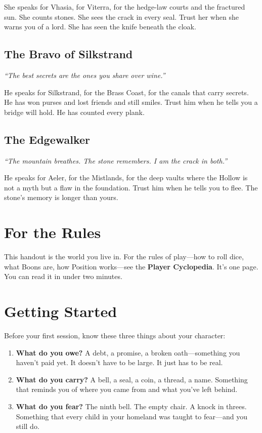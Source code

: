 \documentclass[10pt]{article}
\begin{document}
She speaks for Vhasia, for Viterra, for the hedge-law courts and the fractured sun. 
She counts stones. She sees the crack in every seal. Trust her when she warns you 
of a lord. She has seen the knife beneath the cloak.

\subsection*{The Bravo of Silkstrand}
\emph{``The best secrets are the ones you share over wine.''}

He speaks for Silkstrand, for the Brass Coast, for the canals that carry secrets. 
He has won purses and lost friends and still smiles. Trust him when he tells you 
a bridge will hold. He has counted every plank.

\subsection*{The Edgewalker}
\emph{``The mountain breathes. The stone remembers. I am the crack in both.''}

He speaks for Aeler, for the Mistlands, for the deep vaults where the Hollow is 
not a myth but a flaw in the foundation. Trust him when he tells you to flee. 
The stone's memory is longer than yours.

\section*{For the Rules}

This handout is the world you live in. For the rules of play—how to roll dice, what 
Boons are, how Position works—see the \textbf{Player Cyclopedia}. It's one page. 
You can read it in under two minutes.

\section*{Getting Started}

Before your first session, know these three things about your character:

\begin{enumerate}
\item \textbf{What do you owe?} A debt, a promise, a broken oath---something you 
haven't paid yet. It doesn't have to be large. It just has to be real.

\item \textbf{What do you carry?} A bell, a seal, a coin, a thread, a name. 
Something that reminds you of where you came from and what you've left behind.

\item \textbf{What do you fear?} The ninth bell. The empty chair. A knock in threes. 
Something that every child in your homeland was taught to fear---and you still do.
\end{enumerate}
\end{document}
